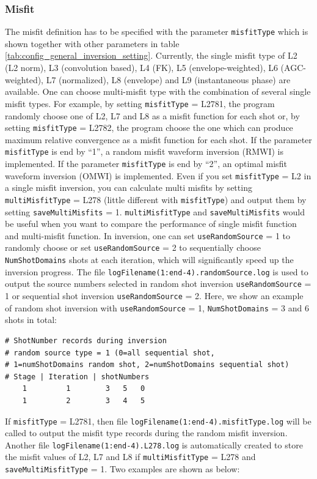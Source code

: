\documentclass[pdftex,a4paper,parskip,listof=totoc,bibliography=totoc,onehalfspacing,12pt]{scrreprt}
\begin{document}
\subsubsection{Misfit}
The misfit definition has to be specified with the parameter \verb+misfitType+ which is shown together with other parameters in table \ref{tab:config_general_inversion_setting}. Currently, the single misfit type of L2 (L2 norm), L3 (convolution based), L4 (FK), L5 (envelope-weighted), L6 (AGC-weighted), L7 (normalized), L8 (envelope) and L9 (instantaneous phase) are available. One can choose multi-misfit type with the combination of several single misfit types. For example, by setting \verb+misfitType+ = L2781, the program randomly choose one of L2, L7 and L8 as a misfit function for each shot or, by setting \verb+misfitType+ = L2782, the program choose the one which can produce maximum relative convergence as a misfit function for each shot. If the parameter \verb+misfitType+ is end by ``1'', a random misfit waveform inversion (RMWI) is implemented. If the parameter \verb+misfitType+ is end by ``2'', an optimal misfit waveform inversion (OMWI) is implemented. Even if you set \verb+misfitType+ = L2 in a single misfit inversion, you can calculate multi misfits by setting \verb+multiMisfitType+ = L278 (little different with \verb+misfitType+) and output them by setting \verb+saveMultiMisfits+ = 1. \verb+multiMisfitType+ and \verb+saveMultiMisfits+ would be useful when you want to compare the performance of single misfit function and multi-misfit function. In inversion, one can set \verb+useRandomSource+ = 1 to randomly choose or set \verb+useRandomSource+ = 2 to sequentially choose \verb+NumShotDomains+ shots at each iteration, which will significantly speed up the inversion progress. The file \verb+logFilename(1:end-4).randomSource.log+ is used to output the source numbers selected in random shot inversion \verb+useRandomSource+ = 1 or sequential shot inversion \verb+useRandomSource+ = 2. Here, we show an example of random shot inversion with \verb+useRandomSource+ = 1, \verb+NumShotDomains+ = 3 and 6 shots in total:
\begin{verbatim}
# ShotNumber records during inversion
# random source type = 1 (0=all sequential shot,
# 1=numShotDomains random shot, 2=numShotDomains sequential shot)
# Stage | Iteration | shotNumbers
    1         1        3   5   0
    1         2        3   4   5
\end{verbatim}
If \verb+misfitType+ = L2781, then file \verb+logFilename(1:end-4).misfitType.log+ will be called to output the misfit type records during the random misfit inversion. Another file \verb+logFilename(1:end-4).L278.log+ is automatically created to store the misfit values of L2, L7 and L8 if \verb+multiMisfitType+ = L278 and \verb+saveMultiMisfitType+ = 1. Two examples are shown as below:
\end{document}
